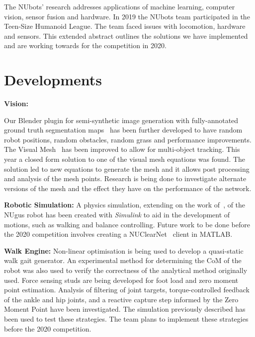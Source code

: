 \documentclass{llncs}
\begin{document}
The NUbots' research addresses applications of machine learning, computer vision, sensor fusion and hardware. 
In 2019 the NUbots team participated in the Teen-Size Humanoid League. The team faced issues with locomotion, hardware and sensors. This extended abstract outlines the solutions we have implemented and are working towards for the competition in 2020.

\section{Developments}

\noindent\textbf{Vision:} 

Our Blender plugin for semi-synthetic image generation with fully-annotated  ground truth segmentation maps~\cite{nubotsNUpbrGit} has been further developed to have random robot positions, random obstacles, random grass and performance improvements. The Visual Mesh~\cite{Houliston2018VisualMR} has been improved to allow for multi-object tracking. This year a closed form solution to one of the visual mesh equations was found. The solution led to new equations to generate the mesh and it allows post processing and analysis of the mesh points. Research is being done to investigate alternate versions of the mesh and the effect they have on the performance of the network.\newline

\noindent\textbf{Robotic Simulation:}
A physics simulation, extending on the work of~\cite{gholami_simulation_2019}, of the NUgus robot has been created with \textit{Simulink} to aid in the development of motions, such as walking and balance controlling. Future work to be done before the 2020 competition involves creating a NUClearNet~\cite{HoulistonEtAl2016} client in MATLAB.\newline

\noindent\textbf{Walk Engine:}
Non-linear optimisation is being used to develop a quasi-static walk gait generator. An experimental method for determining the CoM of the robot was also used to verify the correctness of the analytical method originally used. %
Force sensing studs are being developed for foot load and zero moment point estimation. %
Analysis of filtering of joint targets, torque-controlled feedback of the ankle and hip joints, and a reactive capture step informed by the Zero Moment Point have been investigated. The simulation previously described has been used to test these strategies. The team plans to implement these strategies before the 2020 competition.\newline %
\end{document}

